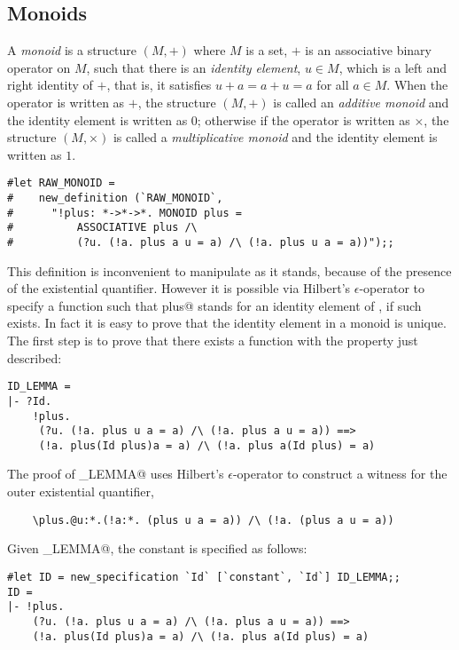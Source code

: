 \subsection{Monoids}

A {\em monoid} is a structure $(M,+)$ where $M$ is a set, $+$ is an
associative binary operator on $M$, such that there is an {\em identity
element}, $u \in M$, which is a left and right identity of $+$, that is,
it satisfies $u+a = a+u = a$ for all $a \in M$. When the operator is written
as $+$, the structure $(M,+)$ is called an {\em additive monoid} and the
identity element is written as $0$; otherwise if the operator is written
as $\times$, the structure $(M,\times)$ is called a {\em multiplicative
monoid} and the identity element is written as $1$.
\begin{session}
\begin{verbatim}
#let RAW_MONOID =
#    new_definition (`RAW_MONOID`,
#      "!plus: *->*->*. MONOID plus =
#          ASSOCIATIVE plus /\
#          (?u. (!a. plus a u = a) /\ (!a. plus u a = a))");;
\end{verbatim}
\end{session}
This definition is inconvenient to manipulate as it stands, because of
the presence of the existential quantifier.  However it is possible via
Hilbert's $\epsilon$-operator to specify a function \verb@Id@ such that
\verb@Id plus@ stands for an identity element of \verb@plus@, if such
exists.  In fact it is easy to prove that the identity element in a monoid
is unique.  The first step is to prove that there exists a function \verb@Id@
with the property just described:
\begin{session}
\begin{verbatim}
ID_LEMMA =
|- ?Id.
    !plus.
     (?u. (!a. plus u a = a) /\ (!a. plus a u = a)) ==>
     (!a. plus(Id plus)a = a) /\ (!a. plus a(Id plus) = a)
\end{verbatim}
\end{session}
The proof of \verb@ID_LEMMA@ uses Hilbert's $\epsilon$-operator to
construct a witness for the outer existential quantifier,
\begin{verbatim}
    \plus.@u:*.(!a:*. (plus u a = a)) /\ (!a. (plus a u = a))
\end{verbatim}
Given \verb@ID_LEMMA@, the constant \verb@Id@ is specified as follows:
\begin{session}
\begin{verbatim}
#let ID = new_specification `Id` [`constant`, `Id`] ID_LEMMA;;
ID =
|- !plus.
    (?u. (!a. plus u a = a) /\ (!a. plus a u = a)) ==>
    (!a. plus(Id plus)a = a) /\ (!a. plus a(Id plus) = a)
\end{verbatim}
\end{session}
